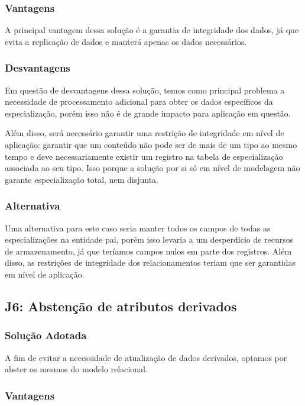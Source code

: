 \subsubsection{Vantagens}

A principal vantagem dessa solução é a garantia de integridade dos dados, já
que evita a replicação de dados e manterá apenas os dados necessários.

\subsubsection{Desvantagens}

Em questão de desvantagens dessa solução, temos como principal problema a
necessidade de processamento adicional para obter os dados específicos da
especialização, porém isso não é de grande impacto para aplicação em questão.

Além disso, será necessário garantir uma restrição de integridade em nível de 
aplicação: garantir que um conteúdo não pode ser de mais de um tipo ao mesmo 
tempo e deve necessariamente existir um registro na tabela de especialização 
associada ao seu tipo. Isso porque a solução por si só em nível de modelagem
não garante especialização total, nem disjunta.

\subsubsection{Alternativa}

Uma alternativa para este caso seria manter todos os campos de todas as
especializações na entidade pai, porém isso levaria a um desperdício de
recursos de armazenamento, já que teríamos campos nulos em parte dos registros.
Além disso, as restrições de integridade dos relacionamentos teriam que ser
garantidas em nível de aplicação.

\subsection{\textbf{J6:} Abstenção de atributos derivados}

\subsubsection{Solução Adotada}

A fim de evitar a necessidade de atualização de dados derivados, optamos por
abster os mesmos do modelo relacional.

\subsubsection{Vantagens}

